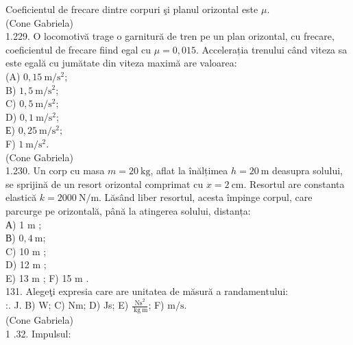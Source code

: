 {Coeficientul de frecare dintre corpuri şi planul orizontal este $\mu$.\\
(Cone Gabriela)\\
1.229. O locomotivă trage o garnitură de tren pe un plan orizontal, cu frecare, coeficientul de frecare fiind egal cu $\mu=0,015$. Accelerația trenului când viteza sa este egală cu jumătate din viteza maximă are valoarea:\\
(A) $0,15 \mathrm{~m} / \mathrm{s}^{2}$;\\
B) $1,5 \mathrm{~m} / \mathrm{s}^{2}$;\\
C) $0,5 \mathrm{~m} / \mathrm{s}^{2}$;\\
D) $0,1 \mathrm{~m} / \mathrm{s}^{2}$;\\
Е) $0,25 \mathrm{~m} / \mathrm{s}^{2}$;\\
F) $1 \mathrm{~m} / \mathrm{s}^{2}$.\\
(Cone Gabriela)\\
1.230. Un corp cu masa $m=20 \mathrm{~kg}$, aflat la înălțimea $h=20 \mathrm{~m}$ deasupra solului, se sprijină de un resort orizontal comprimat cu $x=2 \mathrm{~cm}$. Resortul are constanta elastică $k=2000 \mathrm{~N} / \mathrm{m}$. Lăsând liber resortul, acesta împinge corpul, care parcurge pe orizontală, până la atingerea solului, distanța:\\
А) 1 m ;\\
В) $0,4 \mathrm{~m}$;\\
C) 10 m ;\\
D) 12 m ;\\
E) 13 m ; F) 15 m .\\
131. Alegeţi expresia care are unitatea de măsură a randamentului:\\
:. J. B) W; C) Nm; D) Js; E) $\frac{\mathrm{Ns}^{2}}{\mathrm{~kg} \mathrm{~m}}$; F) $\mathrm{m} / \mathrm{s}$.\\
(Cone Gabriela)\\
1 .32. Impulsul:

}
